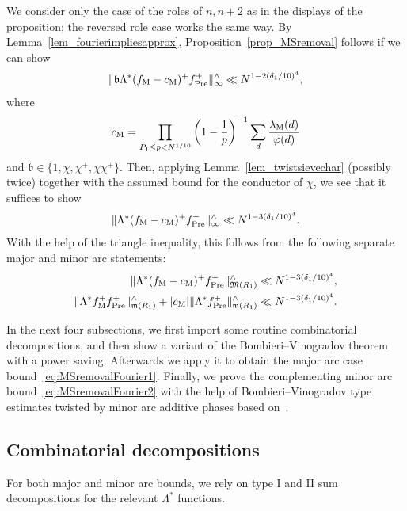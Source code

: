 \documentclass[12pt]{amsart}
\theoremstyle{definition}
\theoremstyle{remark}
\numberwithin{equation}{section}
\newcommand{\1}{\mathbf{1}}
\begin{document}
We consider only the case of the roles of $n,n+2$ as in the displays of the proposition; the reversed role case works the same way. By Lemma~\ref{lem_fourierimpliesapprox}, Proposition~\ref{prop_MSremoval} follows if we can show 
\begin{align}
    \|\mathfrak{b}\Lambda^* (f_{\textup{M}}-c_{\textup{M}})^+f_{\textup{Pre}}^+ \|^\wedge_\infty \ll N^{1-2(\delta_1/10)^{4}},
\end{align}
where 
\begin{align}\label{eq:c_Mdef}    c_{\textup{M}}=\prod_{P_1\le p < N^{1/10}} \left(1-\frac{1}{p}\right)^{-1}\sum_{d}\frac{\lambda_{\mathrm{M}}(d)}{\varphi(d)}
\end{align}
and $\mathfrak{b}\in\{1,\chi,\chi^{+},\chi\chi^{+}\}$. Then, applying Lemma~\ref{lem_twistsievechar} (possibly twice) together with the assumed bound for the conductor of $\chi$, we see that it suffices to show  
\begin{align*}
    \|\Lambda^* (f_{\textup{M}}-c_{\textup{M}})^+f_{\textup{Pre}}^+ \|^\wedge_\infty \ll N^{1-3 (\delta_1/10)^4}.
\end{align*}
With the help of the triangle inequality, this follows from the following separate major and minor arc statements:
\begin{align}\label{eq:MSremovalFourier1}
    \|\Lambda^* (f_{\textup{M}}-c_{\textup{M}})^+f_{\textup{Pre}}^+ \|^\wedge_{\mathfrak{M}(R_1)}\ll N^{1-3 (\delta_1/10)^4},\\
     \|\Lambda^* f_{\textup{M}}^+ f_{\textup{Pre}}^+ \|^\wedge_{\mathfrak{m}(R_1)}+  |c_{\textup{M}}| \|\Lambda^* f_{\textup{Pre}}^+ \|^\wedge_{\mathfrak{m}(R_1)}\ll N^{1-3 (\delta_1/10)^4} \label{eq:MSremovalFourier2}.
\end{align}

In the next four subsections, we first import some routine combinatorial decompositions, and then show a variant of the Bombieri--Vinogradov theorem with a power saving. Afterwards we apply it to obtain the major arc case bound~\eqref{eq:MSremovalFourier1}. Finally, we prove the complementing minor arc bound~\eqref{eq:MSremovalFourier2} with the help of Bombieri--Vinogradov type estimates twisted by minor arc additive phases based on~\cite{matomaki}.


\subsection{Combinatorial decompositions}
For both major and minor arc bounds, we rely on type I and II sum decompositions for the relevant $\Lambda^*$ functions. 
\end{document}
